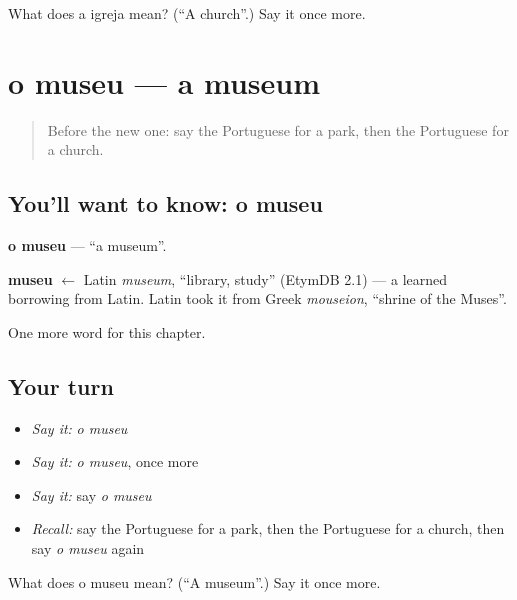 \begin{tcolorbox}[breakable,colback=teal!4,colframe=teal!35!black,title={Before you move on}]
What does a igreja mean? (\textquotedblleft{}A church\textquotedblright{}.) Say it once more.
\end{tcolorbox}
\section[o museu]{o museu — a museum}

\label{lesson:PT-C75-museu}



\begin{quote}
Before the new one: say the Portuguese for a park, then the Portuguese for a church.
\end{quote}

\subsection*{You'll want to know: o museu}
\textbf{o museu} — \textquotedblleft{}a museum\textquotedblright{}.

\begin{cousinweb}
\textbf{museu} $\leftarrow$ Latin \emph{museum}, \textquotedblleft{}library, study\textquotedblright{} (EtymDB 2.1) — a learned borrowing from Latin. Latin took it from Greek \emph{mouseion}, \textquotedblleft{}shrine of the Muses\textquotedblright{}.
\end{cousinweb}

\begin{grammarlens}[title={What you've built}]
One more word for this chapter.
\end{grammarlens}

\subsection*{Your turn}
\begin{itemize}
\raggedright
  \item \emph{Say it:} \emph{o museu}
  \item \emph{Say it:} \emph{o museu}, once more
  \item \emph{Say it:} say \emph{o museu}
  \item \emph{Recall:} say the Portuguese for a park, then the Portuguese for a church, then say \emph{o museu} again
\end{itemize}

\begin{tcolorbox}[breakable,colback=teal!4,colframe=teal!35!black,title={Before you move on}]
What does o museu mean? (\textquotedblleft{}A museum\textquotedblright{}.) Say it once more.
\end{tcolorbox}
